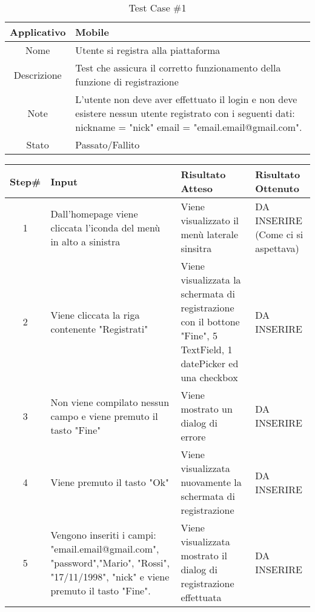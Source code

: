 
\begin{table}[H]
    \centering
    \footnotesize
    \caption{Test Case \#1}
    \begin{tabularx}{\textwidth}{|c|X|}
        \hline
        Applicativo & Mobile\\
        \hline
        Nome & Utente si registra alla piattaforma  \\
        \hline
        Descrizione & Test che assicura il corretto funzionamento della funzione di registrazione\\
        \hline
        Note &  L'utente non deve aver effettuato il login e non deve esistere nessun utente
         registrato con i seguenti dati: nickname = "nick" email = "email.email@gmail.com".\\
        \hline
        Stato & Passato/Fallito\\
        \hline

    \end{tabularx}
    \setlength{\tabcolsep}{8pt}
    \renewcommand{\arraystretch}{1.5}
\end{table}
\begin{table}[H]
    \footnotesize
    \begin{tabularx}{\textwidth}{|c|X|X|X|}
        \hline
        Step\# & Input & Risultato Atteso & Risultato Ottenuto \\
        \hline
         1 & Dall'homepage viene cliccata l'iconda del menù in alto a sinistra 
         & Viene visualizzato il menù laterale sinsitra
         &DA INSERIRE (Come ci si aspettava)\\
          \hline
        2 & Viene cliccata la riga contenente "Registrati"
        & Viene visualizzata la schermata di registrazione con il bottone "Fine", 5 TextField, 1 datePicker ed una checkbox
        & DA INSERIRE\\
         \hline 
        3 & Non viene compilato nessun campo e viene premuto il tasto "Fine"
         & Viene mostrato un dialog di errore & DA INSERIRE\\
          \hline
        4 & Viene premuto il tasto "Ok"
         & Viene visualizzata nuovamente la schermata di registrazione
         & DA INSERIRE\\
          \hline 
          5 & Vengono inseriti i campi: "email.email@gmail.com", "password","Mario",
          "Rossi", "17/11/1998", "nick" e viene premuto il tasto "Fine".
         & Viene visualizzata mostrato il dialog di registrazione effettuata
         & DA INSERIRE\\
          \hline           
    \end{tabularx}
\end{table}
    
       
